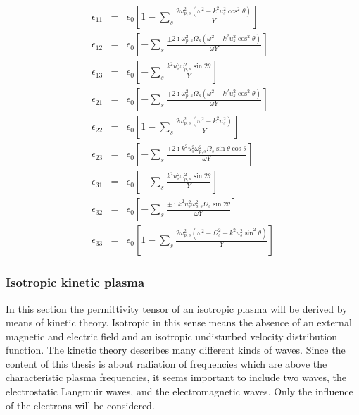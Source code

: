 \documentclass[a4paper,11pt]{thesis}
\begin{document}
\begin{eqnarray}
  \epsilon_{11} &=&  \epsilon_0 \left[ 1-  \sum_s \frac{2 \omega_{p,s}^2(\omega^2-k^2u_s^2 \cos^2\theta)}{Y}\right]\nonumber \\
\epsilon_{12} &=& \epsilon_0 \left[ - \sum_s \frac{\pm 2 \imath \omega_{p,s}^2 \Omega_s(\omega^2-k^2u_s^2 \cos^2\theta)}{\omega Y}\right] \nonumber\\
\epsilon_{13} &=& \epsilon_0 \left[ - \sum_s \frac{k^2u_s^2\omega_{p,s}^2 \sin 2\theta}{Y}\right]\nonumber\\
\epsilon_{21} &=& \epsilon_0 \left[ - \sum_s \frac{\mp 2 \imath \omega_{p,s}^2 \Omega_s(\omega^2-k^2u_s^2 \cos^2\theta)}{\omega Y} \right]\nonumber\\
\epsilon_{22} &=& \epsilon_0 \left[ 1- \sum_s \frac{2\omega_{p,s}^2(\omega^2-k^2u_s^2)}{Y}\right]\nonumber\\
\epsilon_{23} &=& \epsilon_0 \left[ - \sum_s \frac{\mp 2 \imath k^2 u_s^2 \omega_{p,s}^2 \Omega_s  \sin \theta \cos \theta}{\omega Y}\right]\nonumber\\
\epsilon_{31} &=&\epsilon_0 \left[ - \sum_s \frac{k^2u_s^2\omega_{p,s}^2 \sin 2\theta}{Y}\right]\nonumber\\
\epsilon_{32} &=& \epsilon_0 \left[ - \sum_s \frac{\pm \imath k^2 u_s^2 \omega_{p,s}^2 \Omega_s \sin 2 \theta}{\omega Y}\right]\nonumber\\
\epsilon_{33} &=&\epsilon_0 \left[ 1- \sum_s \frac{2 \omega_{p,s}^2(\omega^2-\Omega_s^2-k^2u_s^2\sin^2\theta)}{Y}\right]\nonumber
\end{eqnarray}

\subsubsection{Isotropic kinetic plasma}\label{sec_isotropic_kinetic_permittivity}
In this section the permittivity tensor of an isotropic plasma will be derived by means of kinetic theory. Isotropic in this sense means the
absence of an external magnetic and electric field and an isotropic undisturbed velocity distribution function. The kinetic theory describes
many different kinds of waves. Since the content of this thesis is about radiation of frequencies which are above the characteristic plasma
frequencies, it seems important to include two waves, the electrostatic Langmuir waves, and the electromagnetic waves. Only the influence of
the electrons will be considered.\\
\end{document}
